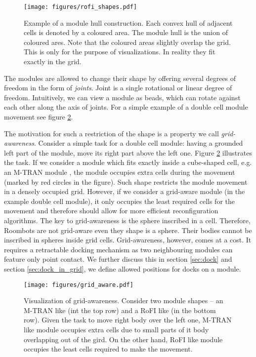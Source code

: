 \begin{figure}[!ht]
    \centering
    \texttt{[image: figures/rofi\_shapes.pdf]}
    \caption{Example of a module hull construction. Each convex hull of adjacent
    cells is denoted by a coloured area. The module hull is the union of coloured
    ares. Note that the coloured areas slightly overlap the grid. This is only
    for the purpose of visualizations. In reality they fit exactly in the grid.}
    \label{fig:rofi_shapes}
\end{figure}

The modules are allowed to change their shape by offering several degrees of
freedom in the form of \emph{joints}. Joint is a single rotational or linear
degree of freedom. Intuitively, we can view a module as beads, which can rotate
against each other along the axis of joints. For a simple example of a double
cell module movement see figure \ref{fig:grid_aware}.

The motivation for such a restriction of the shape is a property we call
\emph{grid-awareness}. Consider a simple task for a double cell module: having a
grounded left part of the module, move its right part above the left one. Figure
\ref{fig:grid_aware} illustrates the task. If we consider a module which fits
exactly inside a cube-shaped cell, e.g. an M-TRAN module
\cite{haruhisa_kurokawa_m-tran_2003}, the module occupies extra cells during the
movement (marked by red circles in the figure). Such shape restricts the module
movement in a densely occupied grid. However, if we consider a grid-aware module
(in the example double cell module), it only occupies the least required cells
for the movement and therefore should allow for more efficient reconfiguration
algorithms. The key to grid-awareness is the sphere inscribed in a cell.
Therefore, Roombots\cite{bonardi_locomotion_2012} are not grid-aware even they
shape is a sphere. Their bodies cannot be inscribed in spheres inside grid
cells. Grid-awareness, however, comes at a cost. It requires a retractable
docking mechanism as two neighbouring modules can feature only point contact. We
further discuss this in section \ref{sec:dock} and section
\ref{sec:dock_in_grid}, we define allowed positions for docks on a module.

\begin{figure}[!t]
    \centering
    \texttt{[image: figures/grid\_aware.pdf]}
    \caption{Visualization of grid-awareness. Consider two module shapes -- an
    M-TRAN\cite{haruhisa_kurokawa_m-tran_2003} like (int the top row) and a RoFI
    like (in the bottom row). Given the task to move right body over the left
    one, M-TRAN like module occupies extra cells due to small parts of it body
    overlapping out of the gird. On the other hand, RoFI like module occupies
    the least cells required to make the movement. }
    \label{fig:grid_aware}
\end{figure}

